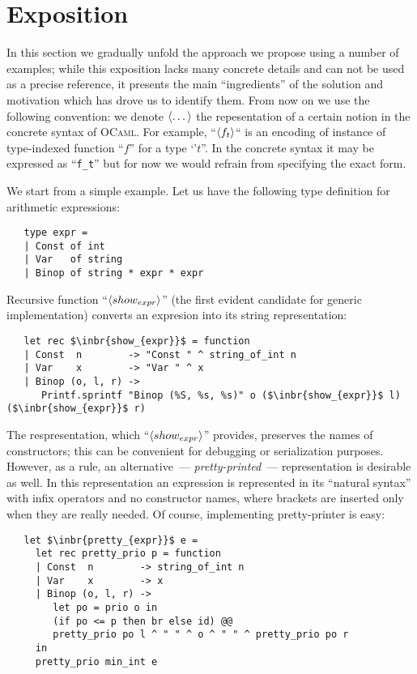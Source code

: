 \section{Exposition}

In this section we gradually unfold the approach we propose using a number of examples; while this exposition lacks many concrete details and can not be used as a
precise reference, it presents the main ``ingredients'' of the solution and motivation which has drove us to identify them. From now on we use the following
convention: we denote $\left<\dots\right>$ the repesentation of a certain notion in the concrete syntax of \textsc{OCaml}. For example, ``$\left<f_t\right>$`` is an encoding of instance
of type-indexed function ``$f$'' for a type `'$t$''. In the concrete syntax it may be expressed as ``\lstinline{f_t}'' but for now we would refrain from specifying
the exact form.

We start from a simple example. Let us have the following type definition for arithmetic expressions:

\begin{lstlisting}
   type expr =
   | Const of int
   | Var   of string
   | Binop of string * expr * expr
\end{lstlisting}

Recursive function ``$\left<show_{expr}\right>$'' (the first evident candidate for generic implementation) converts an expresion into its string representation: 

\begin{lstlisting}
   let rec $\inbr{show_{expr}}$ = function
   | Const  n        -> "Const " ^ string_of_int n
   | Var    x        -> "Var " ^ x
   | Binop (o, l, r) ->
      Printf.sprintf "Binop (%S, %s, %s)" o ($\inbr{show_{expr}}$ l) ($\inbr{show_{expr}}$ r)
\end{lstlisting}

The respresentation, which ``$\left<show_{expr}\right>$'' provides, preserves the names of constructors; this can be convenient for debugging or
serialization purposes. However, as a rule, an alternative~--- \emph{pretty-printed}~--- representation is desirable as well. In this
representation an expression is represented in its ``natural syntax'' with infix operators and no constructor names, where brackets are
inserted only when they are really needed. Of course, implementing pretty-printer is easy:

\begin{lstlisting}
   let $\inbr{pretty_{expr}}$ e =
     let rec pretty_prio p = function
     | Const  n        -> string_of_int n
     | Var    x        -> x
     | Binop (o, l, r) ->
        let po = prio o in
        (if po <= p then br else id) @@
        pretty_prio po l ^ " " ^ o ^ " " ^ pretty_prio po r
     in
     pretty_prio min_int e
\end{lstlisting}

